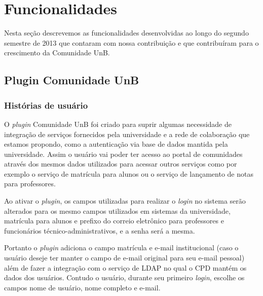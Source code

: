 \section{Funcionalidades}
Nesta seção descrevemos as funcionalidades desenvolvidas ao longo do segundo
semestre de 2013 que contaram com nossa contribuição e que contribuíram para
o crescimento da Comunidade UnB.


\subsection{Plugin Comunidade UnB}

\subsubsection*{Histórias de usuário}

O \textit{plugin} Comunidade UnB foi criado para suprir algumas necessidade de
integração de serviços fornecidos pela universidade e a rede de colaboração que
estamos propondo, como a autenticação via base de dados mantida pela universidade.
Assim o usuário vai poder ter acesso ao portal de comunidades através dos mesmos
dados utilizados para acessar outros serviços como por exemplo o serviço de
matrícula para alunos ou o serviço de lançamento de notas para professores.

Ao ativar o \textit{plugin}, os campos utilizadas para realizar o \textit{login}
no sistema serão alterados para os mesmo campos utilizados em sistemas da
universidade, matrícula para alunos e prefixo do correio eletrônico para
professores e funcionários técnico-administrativos, e a senha será a mesma.

Portanto o \textit{plugin} adiciona o campo matrícula e e-mail institucional
(caso o usuário deseje ter manter o campo de e-mail original para seu e-mail
pessoal) além de fazer a integração com o serviço de LDAP no qual o CPD mantém
os dados dos usuários. Contudo o usuário, durante seu primeiro \textit{login},
escolhe os campos nome de usuário, nome completo e e-mail.


